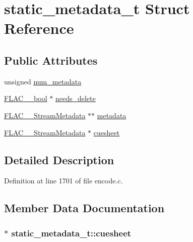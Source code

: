 \hypertarget{structstatic__metadata__t}{}\section{static\+\_\+metadata\+\_\+t Struct Reference}
\label{structstatic__metadata__t}
\subsection*{Public Attributes}
\begin{DoxyCompactItemize}
\item 
unsigned \hyperlink{structstatic__metadata__t_a9ea8b87a5f60a3aac52df745acc1bec7}{num\+\_\+metadata}
\item 
\hyperlink{ordinals_8h_a95103469f1cbd78b8cf250194985b34e}{F\+L\+A\+C\+\_\+\+\_\+bool} $\ast$ \hyperlink{structstatic__metadata__t_a45e0f08a57ffc45f5f067e043e0b6eed}{needs\+\_\+delete}
\item 
\hyperlink{struct_f_l_a_c_____stream_metadata}{F\+L\+A\+C\+\_\+\+\_\+\+Stream\+Metadata} $\ast$$\ast$ \hyperlink{structstatic__metadata__t_aeaef1febb6fcbd68dbb600641e70c826}{metadata}
\item 
\hyperlink{struct_f_l_a_c_____stream_metadata}{F\+L\+A\+C\+\_\+\+\_\+\+Stream\+Metadata} $\ast$ \hyperlink{structstatic__metadata__t_aaf752dbd6ad78a4c5c8e6b8cf14d76c5}{cuesheet}
\end{DoxyCompactItemize}


\subsection{Detailed Description}


Definition at line 1701 of file encode.\+c.



\subsection{Member Data Documentation}
\subsubsection[{\texorpdfstring{cuesheet}{cuesheet}}]{$\ast$ static\+\_\+metadata\+\_\+t\+::cuesheet}\hypertarget{structstatic__metadata__t_aaf752dbd6ad78a4c5c8e6b8cf14d76c5}{}\label{structstatic__metadata__t_aaf752dbd6ad78a4c5c8e6b8cf14d76c5}


